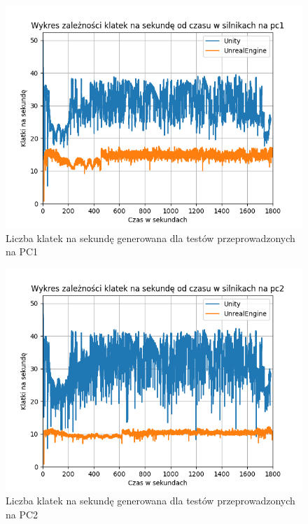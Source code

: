 \documentclass[12pt,twoside]{article}
\begin{document}
\begin{figure}[h]
    \centering
    \includegraphics[width=16cm]{figures/FPSPlots/pc1searchedDataName.png}
    \caption{Liczba klatek na sekundę generowana dla testów przeprowadzonych na PC1}
    \label{Fig:PC1Tests}
\end{figure}        

\begin{figure}[ht]
    \centering
    \includegraphics[width=16cm]{figures/FPSPlots/pc2searchedDataName.png}
    \caption{Liczba klatek na sekundę generowana dla testów przeprowadzonych na PC2}
    \label{Fig:PC2Tests}
\end{figure}        
\end{document}
